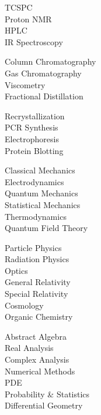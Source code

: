 \begin{minipage}[t]{0.8\textwidth}
  {
    \begin{minipage}[t]{0.30\textwidth}
      TCSPC\\
      Proton NMR\\
      HPLC\\
      IR Spectroscopy
    \end{minipage}
    \begin{minipage}[t]{0.30\textwidth}
      Column Chromatography\\
      Gas Chromatography\\
      Viscometry\\
      Fractional Distillation
    \end{minipage}
    \begin{minipage}[t]{0.30\textwidth}
      Recrystallization\\
      PCR Synthesis\\
      Electrophoresis\\
      Protein Blotting
    \end{minipage}
  }
  
  \vspace*{8pt}

  {
    \begin{minipage}[t]{0.30\textwidth}
      Classical Mechanics\\
      Electrodynamics\\
      Quantum Mechanics\\
      Statistical Mechanics\\
      Thermodynamics\\
      Quantum Field Theory
    \end{minipage}
    \begin{minipage}[t]{0.30\textwidth}
      Particle Physics\\
      Radiation Physics\\
      Optics\\
      General Relativity\\
      Special Relativity\\
      Cosmology\\
      Organic Chemistry
    \end{minipage}
    \begin{minipage}[t]{0.30\textwidth}
      Abstract Algebra\\
      Real Analysis\\
      Complex Analysis\\
      Numerical Methods\\
      PDE\\
      Probability \& Statistics\\
      Differential Geometry
    \end{minipage}
  }


\end{minipage}
